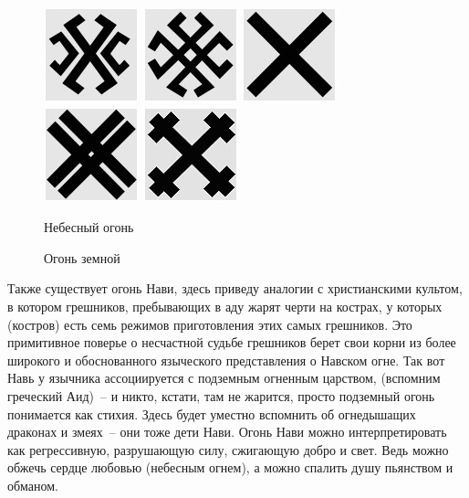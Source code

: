 \documentclass[pscyr,titlepage,chapters]{hedreport}
\begin{document}
  \begin{figure}[ht]
    \center
    \includegraphics{sl_7_1} \hspace{1em}
    \includegraphics{sl_7_2} \hspace{1em}
    \includegraphics{sl_7_3} \hspace{1em}
    \includegraphics{sl_7_4} \hspace{1em}
    \includegraphics{sl_7_5} \\
    \parbox{12.5em}{\caption{Небесный огонь}\label{pic-sky_fire}} \hspace{1em}
    \parbox{20em}{\caption{Огонь земной}\label{pic-earth_fire}}
  \end{figure}

  Также существует огонь Нави, здесь приведу аналогии с христианскими
  культом, в котором грешников, пребывающих в аду жарят черти на кострах, у
  которых (костров) есть семь режимов приготовления этих самых грешников. Это
  примитивное поверье о несчастной судьбе грешников берет свои
  корни из более широкого и обоснованного языческого представления о Навском
  огне. Так вот Навь у язычника ассоциируется с подземным огненным царством,
  (вспомним греческий Аид)~-- и никто, кстати, там не жарится, просто подземный
  огонь понимается как стихия. Здесь будет уместно вспомнить об огнедышащих
  драконах и змеях~-- они тоже дети Нави. Огонь Нави можно интерпретировать как
  регрессивную, разрушающую силу, сжигающую добро и свет. Ведь можно обжечь
  сердце любовью (небесным огнем), а можно спалить душу пьянством и обманом.
\end{document}
